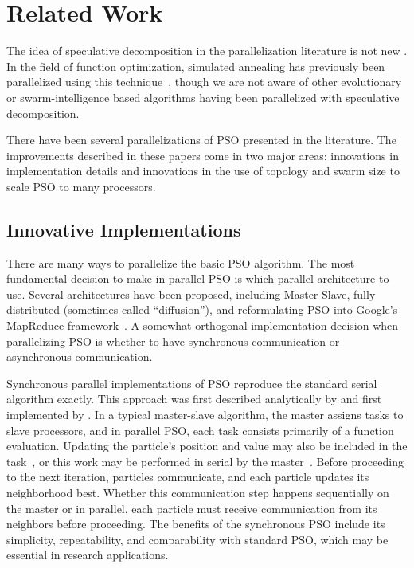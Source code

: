 \documentclass[smallcondensed]{svjour3}
\begin{document}
\section{Related Work}
\label{sec:related}

The idea of speculative decomposition in the parallelization literature is not
new \citep{grama-2003-intro-to-parallel-computing}.  In the field of function
optimization, simulated annealing has previously been parallelized using this
technique~\citep{witte-1991-parallel-simulated-annealing-speculative}, though
we are not aware of other evolutionary or swarm-intelligence based algorithms
having been parallelized with speculative decomposition.

There have been several parallelizations of PSO presented in the literature.
The improvements described in these papers come in two major areas: innovations
in implementation details and innovations in the use of topology and swarm size
to scale PSO to many processors.

\subsection{Innovative Implementations}

There are many ways to parallelize the basic PSO algorithm.  The most
fundamental decision to make in parallel PSO is which parallel architecture to
use.  Several architectures have been proposed, including Master-Slave, fully
distributed (sometimes called ``diffusion''), and reformulating PSO into
Google's MapReduce framework~\citep{belal-2004-parallel-models-for-pso,
mcnabb-2007-parallel-pso-using-mapreduce}.  A somewhat orthogonal
implementation decision when parallelizing PSO is whether to have synchronous
communication or asynchronous communication.

Synchronous parallel implementations of PSO reproduce the standard serial
algorithm exactly.  This approach was first described analytically by
\citet{belal-2004-parallel-models-for-pso} and first implemented by
\citet{schutte-2004-parallel-global-optimization-with-pso}.  In a typical
master-slave algorithm, the master assigns tasks to slave processors, and in
parallel PSO, each task consists primarily of a function evaluation.  Updating
the particle's position and value may also be included in the
task~\citep{belal-2004-parallel-models-for-pso}, or this work may be performed
in serial by the
master~\citep{schutte-2004-parallel-global-optimization-with-pso}.  Before
proceeding to the next iteration, particles communicate, and each particle
updates its neighborhood best.  Whether this communication step happens
sequentially on the master or in parallel, each particle must receive
communication from its neighbors before proceeding.  The benefits of the
synchronous PSO include its simplicity, repeatability, and comparability with
standard PSO, which may be essential in research applications.
\end{document}
